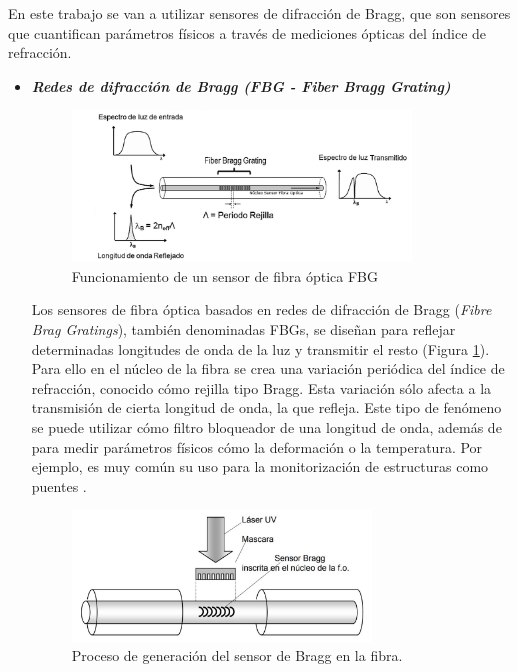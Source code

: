 			
				En este trabajo se van a utilizar sensores de difracción de Bragg, que son sensores que cuantifican parámetros físicos a través de mediciones ópticas del índice de refracción.
		
	\begin{itemize}
		\item \textit{\textbf{Redes de difracción de Bragg \textit{(FBG - Fiber Bragg Grating)}}}	
		
		\begin{figure}[H]
			\centering
			\includegraphics[width=0.85\textwidth]{./img/operacionFBG}
			\caption{Funcionamiento de un sensor de fibra óptica FBG \cite{funcionamientoFBG}} 
			\label{fig:funcionamientoFBG}
		\end{figure}		
		
		Los sensores de fibra óptica basados en redes de difracción de Bragg (\textit{Fibre Brag Gratings}), también denominadas FBGs, se diseñan para reflejar determinadas longitudes de onda de la luz y transmitir el resto (Figura \ref{fig:funcionamientoFBG}). Para ello en el núcleo de la fibra se crea una variación periódica del índice de refracción, conocido cómo rejilla tipo Bragg. Esta variación sólo afecta a la transmisión de cierta longitud de onda, la que refleja. Este tipo de fenómeno se puede utilizar cómo filtro bloqueador de una longitud de onda, además de para medir parámetros físicos cómo la deformación o la temperatura. Por ejemplo, es muy común su uso para la monitorización de estructuras como puentes \cite{FOSensorFrancis}. 
		
		\begin{figure}[H]
			\centering
			\includegraphics[width=0.75\textwidth]{./img/FBGmanufactur}
			\caption{Proceso de generación del sensor de Bragg en la fibra. \cite{tesisUPMmalte}} 
			\label{fig:manufacturaBragg}
		\end{figure}
		

\end{itemize}
